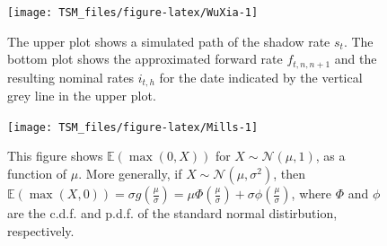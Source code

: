 \documentclass[
  12pt,
]{book}
\newenvironment{Shaded}{\begin{snugshade}}{\end{snugshade}}
\newcommand{\AttributeTok}[1]{\textcolor[rgb]{0.13,0.29,0.53}{#1}}
\newcommand{\DecValTok}[1]{\textcolor[rgb]{0.00,0.00,0.81}{#1}}
\newcommand{\FunctionTok}[1]{\textcolor[rgb]{0.13,0.29,0.53}{\textbf{#1}}}
\newcommand{\NormalTok}[1]{#1}
\newcommand{\SpecialCharTok}[1]{\textcolor[rgb]{0.81,0.36,0.00}{\textbf{#1}}}
\newcommand{\StringTok}[1]{\textcolor[rgb]{0.31,0.60,0.02}{#1}}
\theoremstyle{definition}
\theoremstyle{definition}
\theoremstyle{definition}
\theoremstyle{definition}
\theoremstyle{remark}
\begin{document}
\begin{Shaded}
\end{Shaded}

\begin{figure}

{\centering \texttt{[image: TSM\_files/figure-latex/WuXia-1]} 

}

\caption{The upper plot shows a simulated path of the shadow rate $s_t$. The bottom plot shows the approximated forward rate $f_{t,n,n+1}$ and the resulting nominal rates $i_{t,h}$ for the date indicated by the vertical grey line in the upper plot.}\label{fig:WuXia}
\end{figure}

\begin{figure}

{\centering \texttt{[image: TSM\_files/figure-latex/Mills-1]} 

}

\caption{This figure shows $\mathbb{E}(\max(0,X))$ for $X \sim \mathcal{N}(\mu,1)$, as a function of $\mu$. More generally, if $X\sim \mathcal{N}(\mu,\sigma^2)$, then $\mathbb{E}(\max(X,0))=\sigma g\left(\frac{\mu}{\sigma}\right)= \mu\Phi\left(\frac{\mu}{\sigma}\right)+\sigma\phi\left(\frac{\mu}{\sigma}\right)$, where $\Phi$ and $\phi$ are the c.d.f. and p.d.f. of the standard normal distirbution, respectively.}\label{fig:Mills}
\end{figure}
\end{document}
